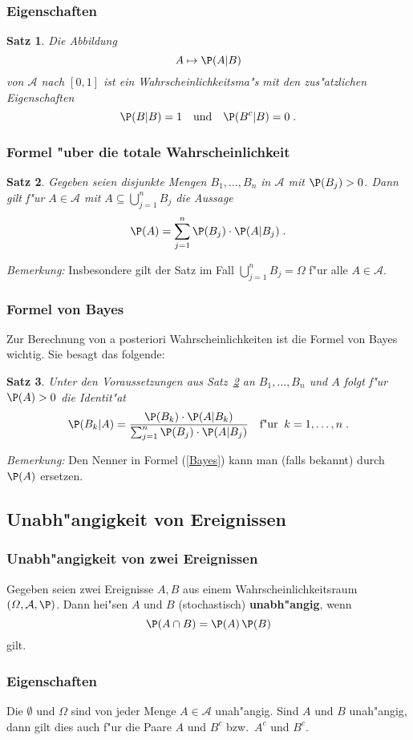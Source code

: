 \documentclass[ngerman,draft,parskip=half,twoside]{scrartcl}
\newtheorem{thm}{Satz}[section]
\newcommand*{\Algeb}{\mathcal{A}}   %
\begin{document}
\subsubsection{Eigenschaften}
\begin{thm}
Die Abbildung
$$
A\mapsto \P(A|B)
$$
von $\Algeb$ nach $[0,1]$ ist ein Wahrscheinlichkeitsma"s mit den zus"atzlichen Eigenschaften
$$
\P(B|B)=1\quad\mbox{und}\quad\P(B^c|B)=0\;.
$$
\end{thm}
\subsubsection{Formel "uber die totale Wahrscheinlichkeit}
\begin{thm}
\label{total}
Gegeben seien disjunkte Mengen $B_1,\ldots,B_n$ in $\Algeb$ mit
$\P(B_j)>0$. Dann gilt f"ur $A\in \Algeb$ mit $A\subseteq\bigcup_{j=1}^n B_j$
die Aussage
$$
\P(A)=\sum_{j=1}^n\P(B_j)\cdot\P(A|B_j)\;.
$$
\end{thm}
\textit{Bemerkung:} Insbesondere gilt der Satz im Fall $\bigcup_{j=1}^n B_j=\Omega$
f"ur alle $A\in\Algeb$.
\subsubsection{Formel von Bayes}
Zur Berechnung von a posteriori Wahrscheinlichkeiten ist die Formel von
Bayes wichtig. Sie besagt das folgende$\colon$
\begin{thm}
Unter den Voraussetzungen aus Satz~\ref{total} an $B_1,\ldots,B_n$ und $A$ folgt
f"ur
$\P(A)>0$ die Identit"at
\begin{equation}
\label{Bayes}
\P(B_k|A)=\frac{\P(B_k)\cdot\P(A|B_k)}{\sum_{j=1}^n
\P(B_j)\cdot\P(A|B_j)}\quad\mbox{f"ur}\;\;k=1,\ldots,n\;.
\end{equation}
\end{thm}
\textit{Bemerkung:} Den Nenner in Formel (\ref{Bayes}) kann man (falls bekannt) durch $\P(A)$
ersetzen.
\subsection{Unabh"angigkeit von Ereignissen}
\subsubsection{Unabh"angigkeit von zwei Ereignissen}
Gegeben seien zwei Ereignisse $A,B$ aus einem Wahrscheinlichkeitsraum $(\Omega,\Algeb,\P)$.
Dann hei"sen $A$ und $B$ (stochastisch) \textbf{unabh"angig}, wenn
$$
\P(A\cap B)=\P(A)\,\P(B)
$$
gilt.
\subsubsection{Eigenschaften}
Die $\emptyset$ und $\Omega$ sind von jeder Menge $A\in\Algeb$ unah"angig. Sind
$A$ und $B$ unah"angig, dann gilt dies auch f"ur die Paare $A$ und $B^c$ bzw.~$A^c$ und $B^c$.
\end{document}

